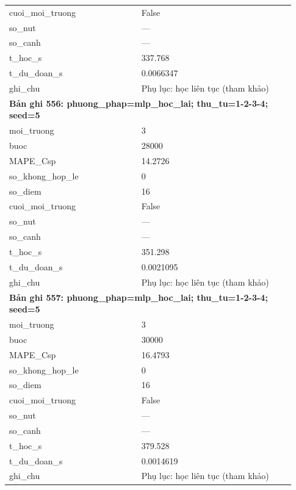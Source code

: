 \begin{longtable}{p{0.43\linewidth}p{0.50\linewidth}}
cuoi\_\allowbreak moi\_\allowbreak truong & False \\
so\_\allowbreak nut & — \\
so\_\allowbreak canh & — \\
t\_\allowbreak hoc\_\allowbreak s & 337.768 \\
t\_\allowbreak du\_\allowbreak doan\_\allowbreak s & 0.0066347 \\
ghi\_\allowbreak chu & Phụ lục: học liên tục (tham khảo) \\
\midrule
\multicolumn{2}{p{0.95\linewidth}}{\textbf{Bản ghi 556: phuong\_phap=mlp\_hoc\_lai; thu\_tu=1-2-3-4; seed=5}} \\
moi\_\allowbreak truong & 3 \\
buoc & 28000 \\
MAPE\_\allowbreak Csp & 14.2726 \\
so\_\allowbreak khong\_\allowbreak hop\_\allowbreak le & 0 \\
so\_\allowbreak diem & 16 \\
cuoi\_\allowbreak moi\_\allowbreak truong & False \\
so\_\allowbreak nut & — \\
so\_\allowbreak canh & — \\
t\_\allowbreak hoc\_\allowbreak s & 351.298 \\
t\_\allowbreak du\_\allowbreak doan\_\allowbreak s & 0.0021095 \\
ghi\_\allowbreak chu & Phụ lục: học liên tục (tham khảo) \\
\midrule
\multicolumn{2}{p{0.95\linewidth}}{\textbf{Bản ghi 557: phuong\_phap=mlp\_hoc\_lai; thu\_tu=1-2-3-4; seed=5}} \\
moi\_\allowbreak truong & 3 \\
buoc & 30000 \\
MAPE\_\allowbreak Csp & 16.4793 \\
so\_\allowbreak khong\_\allowbreak hop\_\allowbreak le & 0 \\
so\_\allowbreak diem & 16 \\
cuoi\_\allowbreak moi\_\allowbreak truong & False \\
so\_\allowbreak nut & — \\
so\_\allowbreak canh & — \\
t\_\allowbreak hoc\_\allowbreak s & 379.528 \\
t\_\allowbreak du\_\allowbreak doan\_\allowbreak s & 0.0014619 \\
ghi\_\allowbreak chu & Phụ lục: học liên tục (tham khảo) \\

\end{longtable}
